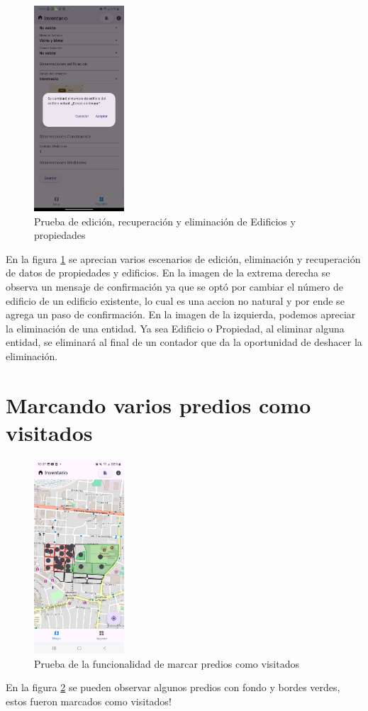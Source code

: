 \begin{figure}[h]
    \includegraphics[width=0.3\textwidth]{Graphics/Capitulo 4/LG Android 13/4.4/4.png}
    \caption{Prueba de edición, recuperación y eliminación de Edificios y propiedades}
    \label{fig:figura23}
\end{figure}

En la figura \ref{fig:figura23} se aprecian varios escenarios de edición, eliminación y recuperación de datos de propiedades y edificios. En la imagen de la extrema derecha
se observa un mensaje de confirmación ya que se optó por cambiar el número de edificio de un edificio existente, lo cual es una accion no natural y por ende se agrega un paso de confirmación.
En la imagen de la izquierda, podemos apreciar la eliminación de una entidad. Ya sea Edificio o Propiedad, al eliminar alguna entidad, se eliminará al final de un contador que da la oportunidad
de deshacer la eliminación.

\pagebreak

\section{Marcando varios predios como visitados}
\begin{figure}[h]
    \centering
    \includegraphics[width=0.3\textwidth]{Graphics/Capitulo 4/Galaxy S23 Ultra Android/4.6/1.jpg}
    \caption{Prueba de la funcionalidad de marcar predios como visitados}
    \label{fig:figura24}
\end{figure}
En la figura \ref{fig:figura24} se pueden observar algunos predios con fondo y bordes verdes, estos fueron marcados como visitados!
\pagebreak

